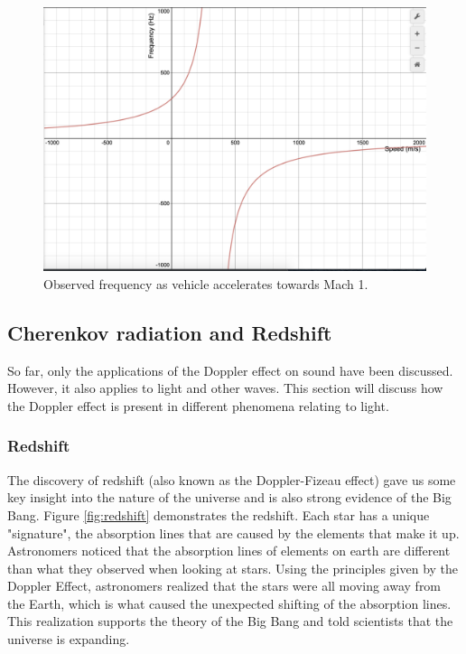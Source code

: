 \documentclass[12pt]{article}
\begin{document}
\begin{figure}[H]
	\centering
	\includegraphics[width=5in]{soundbarrier}
	\caption{Observed frequency as vehicle accelerates towards Mach 1.}
	\label{fig:soundbarrier}
\end{figure}

\subsection{Cherenkov radiation and Redshift}

So far, only the applications of the Doppler effect on sound have been discussed. However, it also applies to light and other waves. This section will discuss how the Doppler effect is present in different phenomena relating to light.

\subsubsection{Redshift}

The discovery of redshift (also known as the Doppler-Fizeau effect) gave us some key insight into the nature of the universe and is also strong evidence of the Big Bang. Figure \ref{fig:redshift} demonstrates the redshift. Each star has a unique "signature", the absorption lines that are caused by the elements that make it up. Astronomers noticed that the absorption lines of elements on earth are different than what they observed when looking at stars. Using the principles given by the Doppler Effect, astronomers realized that the stars were all moving away from the Earth, which is what caused the unexpected shifting of the absorption lines. This realization supports the theory of the Big Bang and told scientists that the universe is expanding.
\end{document}
